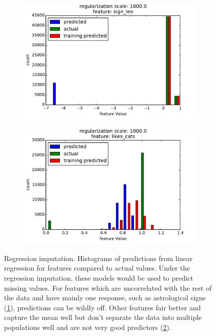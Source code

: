 \documentclass{article} %
\begin{document}
\begin{figure}[]
\centering
\begin{subfigure}{0.5\textwidth}
	\centering
	\includegraphics[width=0.9\linewidth]{figures/imputed_dist_sign_leo.pdf}
	\caption{}
	\label{fig:imputed_dist_sign_leo}
\end{subfigure}%
\begin{subfigure}{0.5\textwidth}
	\centering
	\includegraphics[width=0.9\linewidth]{figures/imputed_dist_likes_cats.pdf}
	\caption{}
	\label{fig:imputed_dist_likes_cats}
\end{subfigure}%
\caption{Regression imputation.  Histograms of predictions from linear regression for features compared to actual values.  Under the regression imputation, these models would be used to predict missing values.  For features which are uncorrelated with the rest of the data and have mainly one response, such as astrological signs (\ref{fig:imputed_dist_sign_leo}), predictions can be wildly off.  Other features fair better and capture the mean well but don't separate the data into multiple populations well and are not very good predictors (\ref{fig:imputed_dist_likes_cats}).
}
\label{fig:linear_imputation}
\end{figure}
\end{document}
